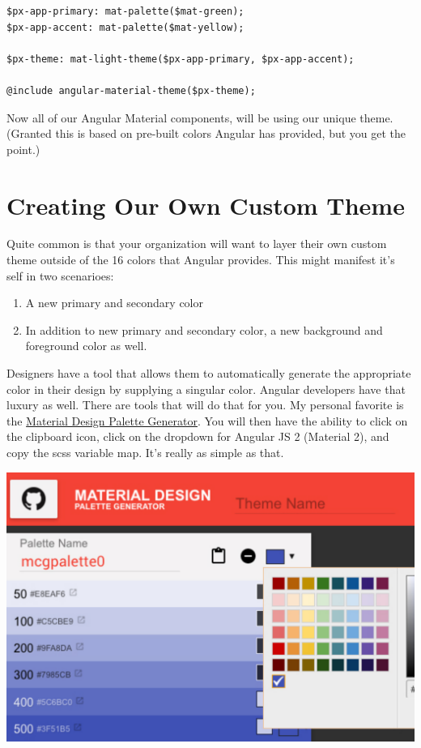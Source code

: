 \begin{lstlisting}
$px-app-primary: mat-palette($mat-green);
$px-app-accent: mat-palette($mat-yellow);

$px-theme: mat-light-theme($px-app-primary, $px-app-accent);

@include angular-material-theme($px-theme);
\end{lstlisting}

Now all of our Angular Material components, will be using our unique theme. 
(Granted this is based on pre-built colors Angular has provided, but you get
the point.)

\section{Creating Our Own Custom Theme}
Quite common is that your organization will want to layer their own custom 
theme outside of the 16 colors that Angular provides. This might manifest it's
self in two scenarioes: 
\begin{enumerate}
  \item A new primary and secondary color
  \item In addition to new primary and secondary color, a new background and 
  foreground color as well. 
\end{enumerate}

Designers have a tool that allows them to automatically generate the appropriate
color in their design by supplying a singular color. Angular developers have
that luxury as well. There are tools that will do that for you. My personal 
favorite is the \href{http://mcg.mbitson.com}{Material Design Palette Generator}.
You will then have the ability to click on the clipboard icon, click on the 
dropdown for Angular JS 2 (Material 2), and copy the scss variable map. It's 
really as simple as that. 

\includegraphics[width=414pt]{design-language-system/material-overrides/palette_generator_screenshot.pdf}

